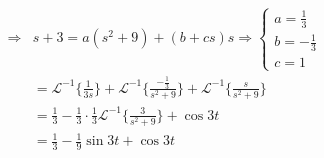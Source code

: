 \documentclass[12pt]{report}
\begin{document}
\begin{itemize}[label={}]
{{\begin{equation*}
\begin{split}
          \Rightarrow & s + 3 = a(s^2 + 9) + (b + cs)s \Rightarrow \begin{cases}
                                                                    a = \frac{1}{3} \\
                                                                    b = -\frac{1}{3} \\
                                                                    c = 1
                                                                   \end{cases} \\
                    & = \mathcal{L}^{-1}\bigg\{\frac{1}{3s} \bigg\} + \mathcal{L}^{-1}\bigg\{\frac{-\frac{1}{3}}{s^2 + 9} \bigg\} + \mathcal{L}^{-1}\bigg\{\frac{s}{s^2 + 9} \bigg\} \\
                    & = \frac{1}{3} - \frac{1}{3}\cdot\frac{1}{3}\mathcal{L}^{-1}\bigg\{\frac{3}{s^2 + 9}\bigg\} + \cos 3t \\
                    & = \frac{1}{3} - \frac{1}{9}\sin 3t + \cos 3t
         \end{split}
        \end{equation*}
    }
 }
\end{itemize}
\end{document}
